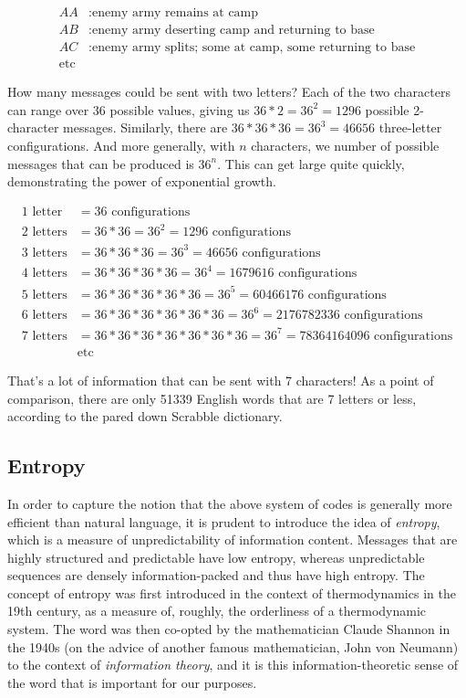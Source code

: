 \documentclass[UTF8]{book}
\begin{document}
\begin{CJK}{UTF8}{gbsn}
\begin{align*}
	AA&: \text{enemy army remains at camp} \\
	AB&: \text{enemy army deserting camp and returning to base} \\
	AC&: \text{enemy army splits; some at camp, some returning to base} \\
        \text{etc} &
\end{align*}

How many messages could be sent with two letters? Each of the two characters can range over 36 possible values, giving us $36*2=36^{2}=1296$ possible 2-character messages. Similarly, there are $36*36*36=36^{3}=46656$ three-letter configurations. And more generally, with $n$ characters, we number of possible messages that can be produced is $36^{n}$. This can get large quite quickly, demonstrating the power of exponential growth.

\begin{align*}
1 \text{ letter} &= 36 \text{ configurations} \\
2 \text{ letters} &= 36*36 = 36^{2} = 1296 \text{ configurations} \\
3 \text{ letters} &= 36*36*36 = 36^{3} = 46656 \text{ configurations} \\
4 \text{ letters} &= 36*36*36*36 = 36^{4} = 1679616 \text{ configurations} \\
5 \text{ letters} &= 36*36*36*36*36 = 36^{5} = 60466176 \text{ configurations} \\
6 \text{ letters} &= 36*36*36*36*36*36 = 36^{6} = 2176782336 \text{ configurations} \\
7 \text{ letters} &= 36*36*36*36*36*36*36 = 36^{7} = 78364164096 \text{ configurations} \\
&\text{etc}
\end{align*}

That's a lot of information that can be sent with 7 characters! As a point of comparison, there are only 51339 English words that are 7 letters or less, according to the pared down Scrabble dictionary.

\subsection{Entropy}

In order to capture the notion that the above system of codes is generally more efficient than natural language, it is prudent to introduce the idea of \emph{entropy}, which is a measure of unpredictability of information content. Messages that are highly structured and predictable have low entropy, whereas unpredictable sequences are densely information-packed and thus have high entropy. The concept of entropy was first introduced in the context of thermodynamics in the 19th century, as a measure of, roughly, the orderliness of a thermodynamic system. The word was then co-opted by the mathematician Claude Shannon in the 1940s (on the advice of another famous mathematician, John von Neumann) to the context of \emph{information theory}, and it is this information-theoretic sense of the word that is important for our purposes.


\end{CJK}
\end{document}
